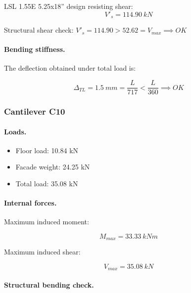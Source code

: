 \noindent LSL 1.55E 5.25x18'' design resisting shear:
\begin{equation}
  V'_s= 114.90\ kN
\end{equation}

\noindent Structural shear check: $V'_s = 114.90 > 52.62 = V_{max} \implies OK$

\paragraph{Bending stiffness.}
The deflection obtained under total load is:

\begin{equation}
  \Delta_{TL}= 1.5\ mm= \frac{L}{717} < \frac{L}{360} \implies OK
\end{equation}

\subsubsection{Cantilever C10}

\paragraph{Loads.}

\begin{itemize}
\item Floor load: 10.84 kN
\item Facade weight: 24.25 kN
\item Total load: 35.08 kN
\end{itemize}

\paragraph{Internal forces.}

\noindent Maximum induced moment:

\begin{equation}
  M_{max}= 33.33\ kN m
\end{equation}

\noindent Maximum induced shear:

\begin{equation}
  V_{max}= 35.08\ kN
\end{equation}

\paragraph{Structural bending check.}

